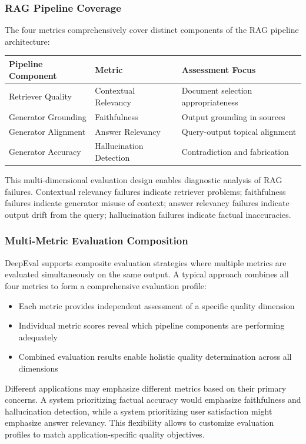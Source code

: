 \subsubsection{RAG Pipeline Coverage}

The four metrics comprehensively cover distinct components of the RAG pipeline architecture:

\begin{center}
\begin{tabular}{|l|l|l|}
\hline
\textbf{Pipeline Component} & \textbf{Metric} & \textbf{Assessment Focus} \\
\hline
Retriever Quality & Contextual Relevancy & Document selection appropriateness \\
\hline
Generator Grounding & Faithfulness & Output grounding in sources \\
\hline
Generator Alignment & Answer Relevancy & Query-output topical alignment \\
\hline
Generator Accuracy & Hallucination Detection & Contradiction and fabrication \\
\hline
\end{tabular}
\end{center}

This multi-dimensional evaluation design enables diagnostic analysis of RAG failures. Contextual relevancy failures indicate retriever problems; faithfulness failures indicate generator misuse of context; answer relevancy failures indicate output drift from the query; hallucination failures indicate factual inaccuracies.

\subsubsection{Multi-Metric Evaluation Composition}

DeepEval supports composite evaluation strategies where multiple metrics are evaluated simultaneously on the same output. A typical approach combines all four metrics to form a comprehensive evaluation profile:

\begin{itemize}
    \item Each metric provides independent assessment of a specific quality dimension
    \item Individual metric scores reveal which pipeline components are performing adequately
    \item Combined evaluation results enable holistic quality determination across all dimensions
\end{itemize}

Different applications may emphasize different metrics based on their primary concerns. A system prioritizing factual accuracy would emphasize faithfulness and hallucination detection, while a system prioritizing user satisfaction might emphasize answer relevancy. This flexibility allows to customize evaluation profiles to match application-specific quality objectives.
